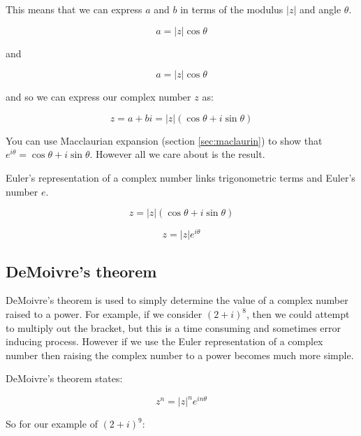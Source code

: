 \documentclass[
]{book}
\begin{document}
This means that we can express \(a\) and \(b\) in terms of the modulus \(|z|\) and angle \(\theta\).

\begin{equation*}
a = |z| \cos \theta
\end{equation*}

and

\begin{equation*}
a = |z| \cos \theta
\end{equation*}

and so we can express our complex number \(z\) as:

\begin{equation}
z = a+bi = |z| (\cos \theta + i \sin \theta)
\label{eq:Euler}
\end{equation}

You can use Macclaurian expansion (section \ref{sec:maclaurin}) to show that \(e^{i\theta} = \cos \theta + i \sin \theta\). However all we care about is the result.

Euler's representation of a complex number links trigonometric terms and Euler's number \(e\).

\begin{equation}
z=|z| (\cos \theta + i \sin \theta)
\label{eq:complextrig}
\end{equation}

\begin{equation}
z = |z| e^{i\theta}
\label{eq:complexeuler}
\end{equation}

\hypertarget{demoivres-theorem}{%
\subsection{DeMoivre's theorem}\label{demoivres-theorem}}

DeMoivre's theorem is used to simply determine the value of a complex number raised to a power. For example, if we consider \((2+ i)^8\), then we could attempt to multiply out the bracket, but this is a time consuming and sometimes error inducing process. However if we use the Euler representation of a complex number then raising the complex number to a power becomes much more simple.

DeMoivre's theorem states:

\begin{equation}
z^n = |z|^n e^{in\theta}
\label{eq:demoivre}
\end{equation}

So for our example of \((2+ i)^9\):
\end{document}
